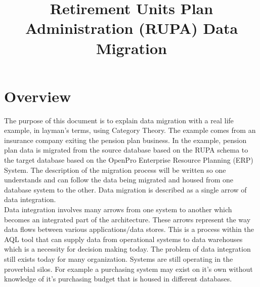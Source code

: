 \documentclass{article}
\begin{document}
\title{Retirement Units Plan Administration (RUPA) Data Migration}
\author{ }
\date{}
\maketitle



\noindent
\tableofcontents
\section{Overview}
The purpose of this document is to explain data migration with a real life example, in layman's terms, using Category Theory.  The example comes from an insurance company exiting the pension plan business.   In the example, pension plan data is migrated from the source database based on the RUPA schema to the target database based on the OpenPro Enterprise Resource Planning (ERP) System.  The description of the migration process will be written so one understands and can follow the data being migrated and housed from one database system to the other. Data migration is described as a single arrow of data integration. \\

Data integration involves many arrows from one system to another which becomes an integrated  part of the  architecture.  These arrows represent  the way  data flows between various applications/data stores.  This is a  process  within the AQL tool that can supply data from operational systems to data warehouses which is a necessity for decision making today.  The  problem of data integration still exists today for many organization.  Systems are still operating in the proverbial silos.  For example a purchasing system may exist on it's own without knowledge of it's purchasing budget that is housed in different databases. \\
\end{document}
